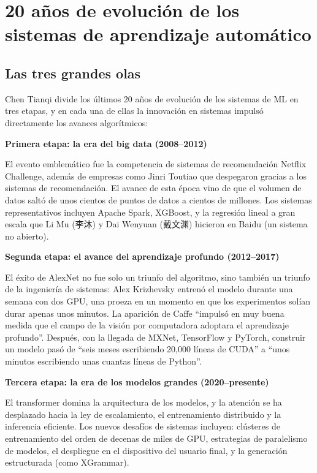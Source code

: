 \section{20 años de evolución de los sistemas de aprendizaje automático}

\subsection{Las tres grandes olas}

Chen Tianqi divide los últimos 20 años de evolución de los sistemas de ML en tres etapas, y en cada una de ellas la innovación en sistemas impulsó directamente los avances algorítmicos:

\textbf{Primera etapa: la era del big data (2008--2012)}

El evento emblemático fue la competencia de sistemas de recomendación Netflix Challenge, además de empresas como Jinri Toutiao que despegaron gracias a los sistemas de recomendación. El avance de esta época vino de que el volumen de datos saltó de unos cientos de puntos de datos a cientos de millones. Los sistemas representativos incluyen Apache Spark, XGBoost, y la regresión lineal a gran escala que Li Mu (李沐) y Dai Wenyuan (戴文渊) hicieron en Baidu (un sistema no abierto).

\textbf{Segunda etapa: el avance del aprendizaje profundo (2012--2017)}

El éxito de AlexNet no fue solo un triunfo del algoritmo, sino también un triunfo de la ingeniería de sistemas: Alex Krizhevsky entrenó el modelo durante una semana con dos GPU, una proeza en un momento en que los experimentos solían durar apenas unos minutos. La aparición de Caffe ``impulsó en muy buena medida que el campo de la visión por computadora adoptara el aprendizaje profundo''. Después, con la llegada de MXNet, TensorFlow y PyTorch, construir un modelo pasó de ``seis meses escribiendo 20,000 líneas de CUDA'' a ``unos minutos escribiendo unas cuantas líneas de Python''.

\textbf{Tercera etapa: la era de los modelos grandes (2020--presente)}

El transformer domina la arquitectura de los modelos, y la atención se ha desplazado hacia la ley de escalamiento, el entrenamiento distribuido y la inferencia eficiente. Los nuevos desafíos de sistemas incluyen: clústeres de entrenamiento del orden de decenas de miles de GPU, estrategias de paralelismo de modelos, el despliegue en el dispositivo del usuario final, y la generación estructurada (como XGrammar).

